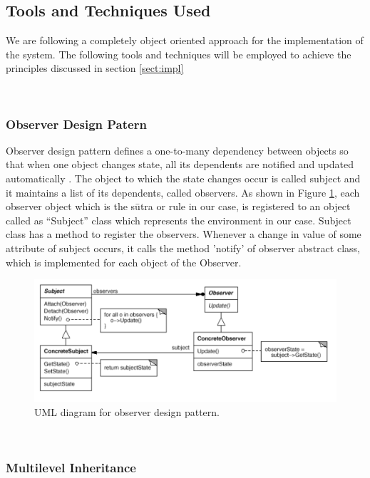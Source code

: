 \documentclass[a4paper,11pt,twoside,openright]{report}
\begin{document}
\subsection{Tools and Techniques Used}
\label{sect:tools}
We are following a completely object oriented approach for the implementation of the system.
The following tools and techniques will be employed to achieve the principles discussed in section \ref{sect:impl} 

\\
\subsubsection{Observer Design Patern}
Observer design pattern defines a one-to-many dependency between objects so that when one object changes state, all its dependents are notified and updated automatically \cite{obs}. The object to which the state changes occur is called subject and it maintains a list of its dependents, called observers. As shown in Figure \ref{fig:obsUML}, each observer object which is the sūtra or rule in our case, is registered to an object called as “Subject” class which represents the environment in our case. Subject class has a method to register the observers. Whenever a change in value of some attribute of subject occurs, it calls the method 'notify' of observer abstract class, which is implemented for each object of the Observer.

\begin{figure}[h]
    \centering
	\includegraphics[width=\textwidth]{obsUML}
    \caption[UML diagram for observer design pattern]{UML diagram for observer design pattern.\cite{obs} }
    \label{fig:obsUML}
\end{figure}

\\
\subsubsection{Multilevel Inheritance}
\end{document}
